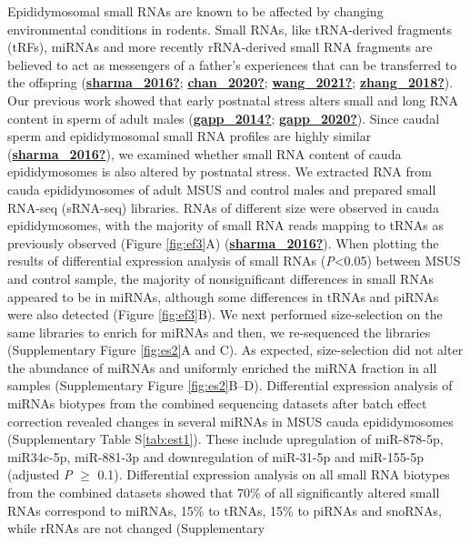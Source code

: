 \documentclass[12pt,twoside]{reedthesis}
\begin{document}
Epididymosomal small RNAs are known to be affected by changing
environmental conditions in rodents. Small RNAs, like tRNA-derived
fragments (tRFs), miRNAs and more recently rRNA-derived small RNA
fragments are believed to act as messengers of a father's experiences
that can be transferred to the offspring (\protect\hyperlink{ref-sharma_2016}{\textbf{sharma\_2016?}}; \protect\hyperlink{ref-chan_2020}{\textbf{chan\_2020?}}; \protect\hyperlink{ref-wang_2021}{\textbf{wang\_2021?}}; \protect\hyperlink{ref-zhang_2018}{\textbf{zhang\_2018?}}). Our previous work showed that early postnatal
stress alters small and long RNA content in sperm of adult males
(\protect\hyperlink{ref-gapp_2014}{\textbf{gapp\_2014?}}; \protect\hyperlink{ref-gapp_2020}{\textbf{gapp\_2020?}}). Since caudal sperm and epididymosomal small RNA
profiles are highly similar (\protect\hyperlink{ref-sharma_2016}{\textbf{sharma\_2016?}}), we examined whether small RNA
content of cauda epididymosomes is also altered by postnatal stress. We
extracted RNA from cauda epididymosomes of adult MSUS and control males
and prepared small RNA-seq (sRNA-seq) libraries. RNAs of different size
were observed in cauda epididymosomes, with the majority of small RNA
reads mapping to tRNAs as previously observed (Figure \ref{fig:ef3}A)
(\protect\hyperlink{ref-sharma_2016}{\textbf{sharma\_2016?}}). When plotting the results of differential expression
analysis of small RNAs (\emph{P}\textless0.05) between MSUS and control sample, the
majority of nonsignificant differences in small RNAs appeared to be in
miRNAs, although some differences in tRNAs and piRNAs were also detected
(Figure \ref{fig:ef3}B). We next performed size-selection on the same libraries to
enrich for miRNAs and then, we re-sequenced the libraries
(Supplementary Figure \ref{fig:es2}A and C). As expected, size-selection did not
alter the abundance of miRNAs and uniformly enriched the miRNA fraction
in all samples (Supplementary Figure \ref{fig:es2}B--D). Differential expression
analysis of miRNAs biotypes from the combined sequencing datasets after
batch effect correction revealed changes in several miRNAs in MSUS cauda
epididymosomes (Supplementary Table S\ref{tab:est1}). These include upregulation of
miR-878-5p, miR34c-5p, miR-881-3p and downregulation of miR-31-5p and
miR-155-5p (adjusted \emph{P} \(\geq\) 0.1). Differential expression analysis
on all small RNA biotypes from the combined datasets showed that 70\% of
all significantly altered small RNAs correspond to miRNAs, 15\% to tRNAs,
15\% to piRNAs and snoRNAs, while rRNAs are not changed (Supplementary
\end{document}
